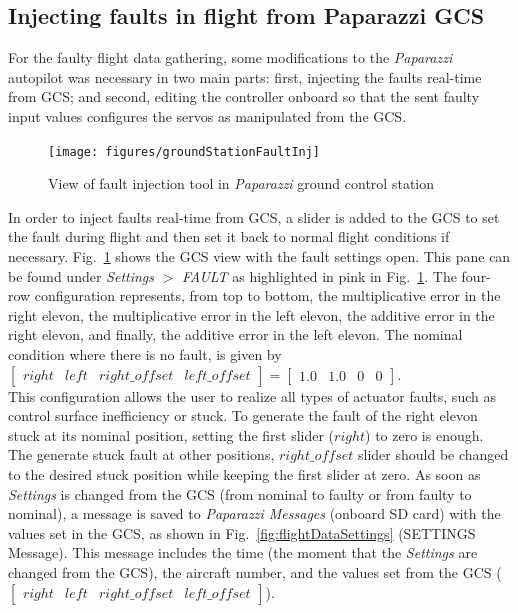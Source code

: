 \subsection{Injecting faults in flight from Paparazzi GCS}

For the faulty flight data gathering, some modifications to the \emph{Paparazzi} autopilot was necessary in two main parts: first, injecting the faults real-time from GCS; and second, editing the controller onboard so that the sent faulty input values configures the servos as manipulated from the GCS.

\begin{figure}
\begin{center}
\texttt{[image: figures/groundStationFaultInj]}    %
\caption{View of fault injection tool in \emph{Paparazzi} ground control station} 
\label{fig:groundStationFaultInj}
\end{center}
\end{figure}

In order to inject faults real-time from GCS, a slider is added to the GCS to set the fault during flight and then set it back to normal flight conditions if necessary.
Fig.~\ref{fig:groundStationFaultInj} shows the GCS view with the fault settings open. 
This pane can be found under  \emph{Settings} $>$  \emph{FAULT} as highlighted in pink in Fig.~\ref{fig:groundStationFaultInj}. 
The four-row configuration represents, from top to bottom, the multiplicative error in the right elevon, the multiplicative error in the left elevon, the additive error in the right elevon, and finally, the additive error in the left elevon. 
The nominal condition where there is no fault, is given by $[\begin{matrix}right & left & right\_offset &left\_offset\end{matrix}] = [\begin{matrix} 1.0 & 1.0 & 0 & 0\end{matrix}]$. \\
This configuration allows the user to realize all types of actuator faults, such as control surface inefficiency or stuck. 
To generate the fault of the right elevon stuck at its nominal position, setting the first slider ($right$) to zero is enough. 
The generate stuck fault at other positions, $right\_offset$ slider should be changed to the desired stuck position while keeping the first slider at zero.
As soon as \emph{Settings} is changed from the GCS (from nominal to faulty or from faulty to nominal), a message is saved to \emph{Paparazzi Messages} (onboard SD card) with the values set in the GCS, as shown in Fig.~\ref{fig:flightDataSettings} (SETTINGS Message). 
This message includes the time (the moment that the \emph{Settings} are changed from the GCS), the aircraft number, and the values set from the GCS ($[\begin{matrix}right & left & right\_offset &left\_offset\end{matrix}]$).

